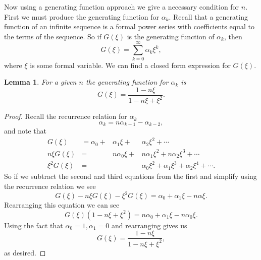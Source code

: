 \documentclass[12pt]{article}
\newtheorem{lemma}{Lemma}
\begin{document}
Now using a generating function approach we give a necessary condition for $n$. 
First we must produce the generating function for $\alpha_k$. Recall that a generating function of an infinite sequence is a formal power series with coefficients equal to the terms of the sequence.  So if $G(\xi)$ is the generating function of $\alpha_k$, then 
\begin{equation*}
G(\xi) = \sum_{k=0}^{\infty} \alpha_k \xi^k,
\end{equation*}
where $\xi$ is some formal variable. We can find a closed form expression for $G(\xi)$.

\begin{lemma} For a given $n$ the generating function for $\alpha_k$ is 
\begin{equation*}
G(\xi) = \frac{ 1 - n\xi}{1 - n \xi + \xi^2} .
\end{equation*}
\end{lemma}
\begin{proof}
Recall the recurrence relation for $\alpha_k$ 
\begin{equation*}
\alpha_k = n \alpha_{k-1} - \alpha_{k-2}, 
\end{equation*}
and note that 
\begin{align*}
G(\xi) &= \alpha_0 + &\alpha_1 \xi + &\alpha_2 \xi^2 + \cdots \\
n \xi G(\xi) &= &n\alpha_0 \xi + &n\alpha_1 \xi^2 + n\alpha_2 \xi^3 + \cdots \\
\xi^2 G(\xi) &= &&\alpha_0 \xi^2 + \alpha_1 \xi^3 + \alpha_2 \xi^4 + \cdots.
\end{align*}
So if we subtract the second and third equations from the first and simplify using the recurrence relation we see 
\begin{equation*}
G(\xi) - n \xi G(\xi) - \xi^2 G(\xi) = \alpha_0 + \alpha_1 \xi - n \alpha \xi.
\end{equation*}
Rearranging this equation we can see 
\begin{equation*}
G( \xi) (1-n \xi + \xi^2) = n\alpha_0 + \alpha_1 \xi - n\alpha_0 \xi.
\end{equation*}
Using the fact that $\alpha_0=1, \alpha_1=0$ and rearranging gives us
\begin{equation*}
G(\xi) = \frac{ 1 - n\xi}{1 - n \xi + \xi^2},
\end{equation*}
as desired.
\end{proof}
\end{document}
